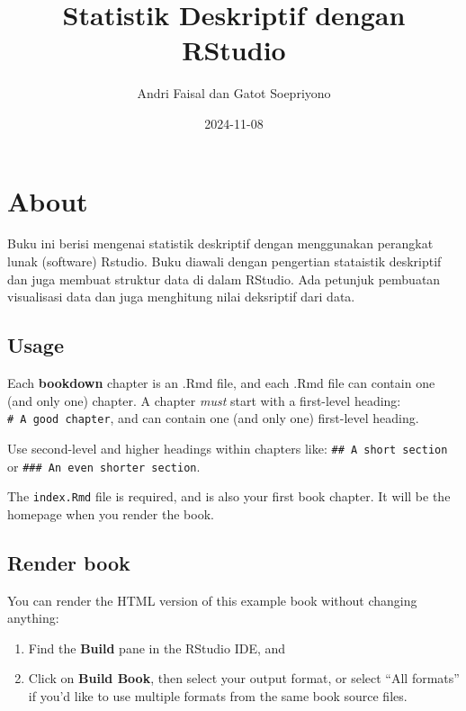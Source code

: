 \documentclass[
]{book}
\title{Statistik Deskriptif dengan RStudio}
\author{Andri Faisal dan Gatot Soepriyono}
\date{2024-11-08}
\theoremstyle{definition}
\theoremstyle{definition}
\theoremstyle{definition}
\theoremstyle{definition}
\theoremstyle{remark}
\begin{document}
\maketitle

{
\setcounter{tocdepth}{1}
\tableofcontents
}
\hypertarget{about}{%
\chapter{About}\label{about}}

Buku ini berisi mengenai statistik deskriptif dengan menggunakan perangkat lunak (software) Rstudio. Buku diawali dengan pengertian stataistik deskriptif dan juga membuat struktur data di dalam RStudio. Ada petunjuk pembuatan visualisasi data dan juga menghitung nilai deksriptif dari data.

\hypertarget{usage}{%
\section{Usage}\label{usage}}

Each \textbf{bookdown} chapter is an .Rmd file, and each .Rmd file can contain one (and only one) chapter. A chapter \emph{must} start with a first-level heading: \texttt{\#\ A\ good\ chapter}, and can contain one (and only one) first-level heading.

Use second-level and higher headings within chapters like: \texttt{\#\#\ A\ short\ section} or \texttt{\#\#\#\ An\ even\ shorter\ section}.

The \texttt{index.Rmd} file is required, and is also your first book chapter. It will be the homepage when you render the book.

\hypertarget{render-book}{%
\section{Render book}\label{render-book}}

You can render the HTML version of this example book without changing anything:

\begin{enumerate}
\def\labelenumi{\arabic{enumi}.}
\item
  Find the \textbf{Build} pane in the RStudio IDE, and
\item
  Click on \textbf{Build Book}, then select your output format, or select ``All formats'' if you'd like to use multiple formats from the same book source files.
\end{enumerate}
\end{document}
